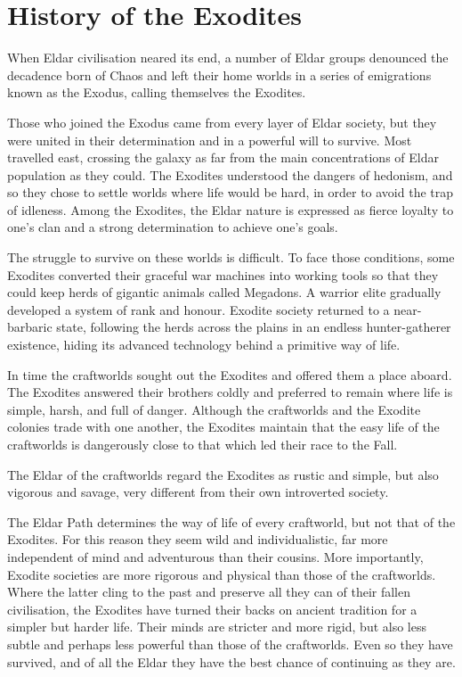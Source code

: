 \section{History of the Exodites}

When Eldar civilisation neared its end, a number of Eldar groups denounced the decadence born of Chaos and left their home worlds in a series of emigrations known as the Exodus, calling themselves the Exodites.

Those who joined the Exodus came from every layer of Eldar society, but they were united in their determination and in a powerful will to survive. Most travelled east, crossing the galaxy as far from the main concentrations of Eldar population as they could. The Exodites understood the dangers of hedonism, and so they chose to settle worlds where life would be hard, in order to avoid the trap of idleness. Among the Exodites, the Eldar nature is expressed as fierce loyalty to one's clan and a strong determination to achieve one's goals.

The struggle to survive on these worlds is difficult. To face those conditions, some Exodites converted their graceful war machines into working tools so that they could keep herds of gigantic animals called Megadons. A warrior elite gradually developed a system of rank and honour. Exodite society returned to a near-barbaric state, following the herds across the plains in an endless hunter-gatherer existence, hiding its advanced technology behind a primitive way of life.

In time the craftworlds sought out the Exodites and offered them a place aboard. The Exodites answered their brothers coldly and preferred to remain where life is simple, harsh, and full of danger. Although the craftworlds and the Exodite colonies trade with one another, the Exodites maintain that the easy life of the craftworlds is dangerously close to that which led their race to the Fall.

The Eldar of the craftworlds regard the Exodites as rustic and simple, but also vigorous and savage, very different from their own introverted society.

The Eldar Path determines the way of life of every craftworld, but not that of the Exodites. For this reason they seem wild and individualistic, far more independent of mind and adventurous than their cousins. More importantly, Exodite societies are more rigorous and physical than those of the craftworlds. Where the latter cling to the past and preserve all they can of their fallen civilisation, the Exodites have turned their backs on ancient tradition for a simpler but harder life. Their minds are stricter and more rigid, but also less subtle and perhaps less powerful than those of the craftworlds. Even so they have survived, and of all the Eldar they have the best chance of continuing as they are.
